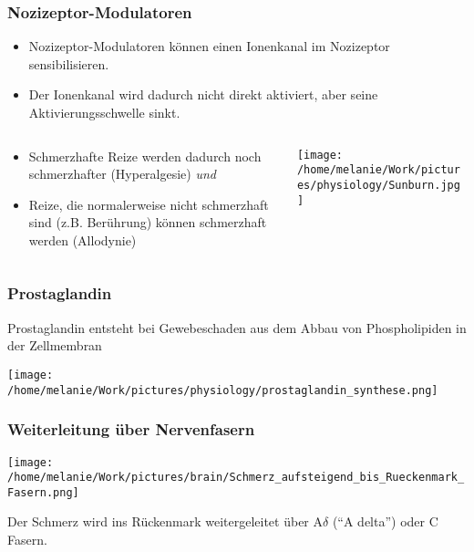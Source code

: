 \documentclass{beamer}
\begin{document}
\begin{frame}
\frametitle{Nozizeptor-Modulatoren}

\begin{itemize}
\item
Nozizeptor-Modulatoren können einen Ionenkanal im Nozizeptor sensibilisieren.
\item
Der Ionenkanal wird dadurch nicht direkt aktiviert, aber seine Aktivierungsschwelle sinkt.
\end{itemize}

\begin{columns}[c]
\begin{column}{6.5cm}

\begin{itemize}
\item
Schmerzhafte Reize werden dadurch noch schmerzhafter (Hyperalgesie) \emph{und}

\item
Reize, die normalerweise nicht schmerzhaft sind (z.B. Berührung) können schmerzhaft werden (Allodynie)
\end{itemize}
\end{column}

\begin{column}{5cm}
\begin{center}
\texttt{[image: /home/melanie/Work/pictures/physiology/Sunburn.jpg]}
\end{center}

\end{column}
\end{columns}

\end{frame}



\begin{frame}
\frametitle{Prostaglandin}

Prostaglandin entsteht bei Gewebeschaden aus dem Abbau von Phospholipiden in der Zellmembran

\pause

\begin{center}
\texttt{[image: /home/melanie/Work/pictures/physiology/prostaglandin\_synthese.png]}
\end{center}



\end{frame}


\begin{frame}
\frametitle{Weiterleitung über Nervenfasern}
 
\begin{center}
\texttt{[image: /home/melanie/Work/pictures/brain/Schmerz\_aufsteigend\_bis\_Rueckenmark\_Fasern.png]}
\end{center}

Der Schmerz wird ins Rückenmark weitergeleitet über A\(\delta\) (``A delta'') oder C Fasern. 

\end{frame}
\end{document}
